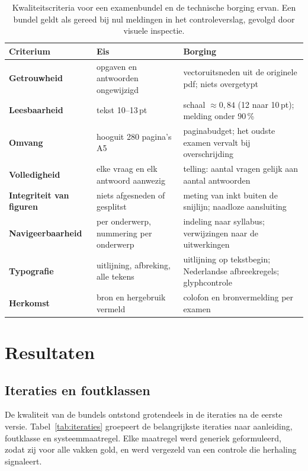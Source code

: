 \documentclass[10.5pt,a4paper]{article}
\begin{document}
\begin{table}[!htb]
\centering\small
\begin{tabularx}{\linewidth}{@{}>{\sffamily\bfseries}p{29mm} X X@{}}
\toprule
\normalfont\sffamily\bfseries Criterium & \sffamily\bfseries Eis & \sffamily\bfseries Borging \\
\midrule
Getrouwheid & opgaven en antwoorden ongewijzigd & vectoruitsneden uit de originele pdf; niets overgetypt \\
Leesbaarheid & tekst 10--13\,pt & schaal $\approx 0{,}84$ (12 naar 10\,pt); melding onder 90\,\% \\
Omvang & hooguit 280 pagina's A5 & paginabudget; het oudste examen vervalt bij overschrijding \\
Volledigheid & elke vraag en elk antwoord aanwezig & telling: aantal vragen gelijk aan aantal antwoorden \\
Integriteit van figuren & niets afgesneden of gesplitst & meting van inkt buiten de snijlijn; naadloze aansluiting \\
Navigeerbaarheid & per onderwerp, nummering per onderwerp & indeling naar syllabus; verwijzingen naar de uitwerkingen \\
Typografie & uitlijning, afbreking, alle tekens & uitlijning op tekstbegin; Nederlandse afbreekregels; glyphcontrole \\
Herkomst & bron en hergebruik vermeld & colofon en bronvermelding per examen \\
\bottomrule
\end{tabularx}
\caption{Kwaliteitscriteria voor een examenbundel en de technische borging ervan. Een bundel geldt als gereed bij nul
meldingen in het controleverslag, gevolgd door visuele inspectie.}
\label{tab:criteria}
\end{table}

\section{Resultaten}

\subsection{Iteraties en foutklassen}
De kwaliteit van de bundels ontstond grotendeels in de iteraties na de eerste versie. Tabel~\ref{tab:iteraties} groepeert de
belangrijkste iteraties naar aanleiding, foutklasse en systeemmaatregel. Elke maatregel werd generiek geformuleerd, zodat
zij voor alle vakken gold, en werd vergezeld van een controle die herhaling signaleert.
\end{document}
